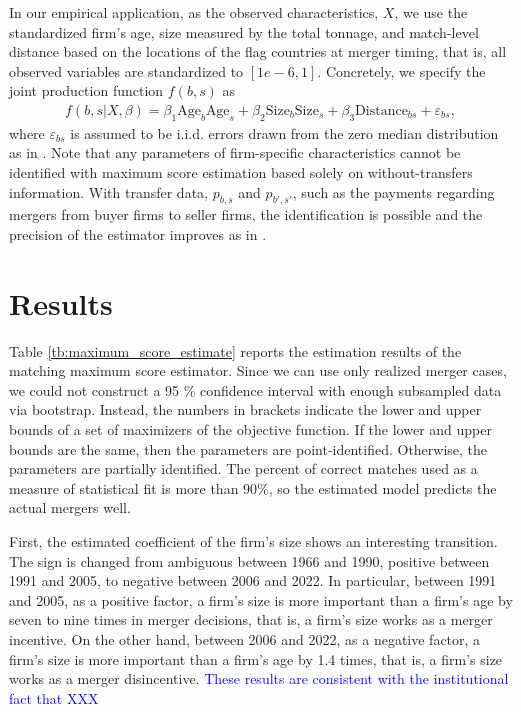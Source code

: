 \documentclass[10pt]{article}
\begin{document}
In our empirical application, as the observed characteristics, $X$, we use the standardized firm's age, size measured by the total tonnage, and match-level distance based on the locations of the flag countries at merger timing, that is, all observed variables are standardized to $[1e-6,1]$. 
Concretely, we specify the joint production function $f(b,s)$ as
\begin{align}
    f(b,s|X,\beta)= \beta_1 \text{Age}_{b}\text{Age}_{s} + \beta_2 \text{Size}_{b}\text{Size}_{s} + \beta_3 \text{Distance}_{bs} + \varepsilon_{bs},\label{eq:joint_production}
\end{align}
where $\varepsilon_{bs}$ is assumed to be i.i.d. errors drawn from the zero median distribution as in \cite{fox2018qe}. 
Note that any parameters of firm-specific characteristics cannot be identified with maximum score estimation based solely on without-transfers information. With transfer data, $p_{b,s}$ and $p_{b',s'}$, such as the payments regarding mergers from buyer firms to seller firms, the identification is possible and the precision of the estimator improves as in \cite{akkus2015ms}.


\section{Results}\label{sec:results}

Table \ref{tb:maximum_score_estimate} reports the estimation results of the matching maximum score estimator. 
Since we can use only realized merger cases, we could not construct a 95 \% confidence interval with enough subsampled data via bootstrap.
Instead, the numbers in brackets indicate the lower and upper bounds of a set of maximizers of the objective function. 
If the lower and upper bounds are the same, then the parameters are point-identified. 
Otherwise, the parameters are partially identified.
The percent of correct matches used as a measure of statistical fit is more than 90\%, so the estimated model predicts the actual mergers well.

First, the estimated coefficient of the firm's size shows an interesting transition. 
The sign is changed from ambiguous between 1966 and 1990, positive between 1991 and 2005, to negative between 2006 and 2022. 
In particular, between 1991 and 2005, as a positive factor, a firm's size is more important than a firm's age by seven to nine times in merger decisions, that is, a firm's size works as a merger incentive.
On the other hand, between 2006 and 2022, as a negative factor, a firm's size is more important than a firm's age by 1.4 times, that is, a firm's size works as a merger disincentive.
\textcolor{blue}{These results are consistent with the institutional fact that XXX}
\end{document}
